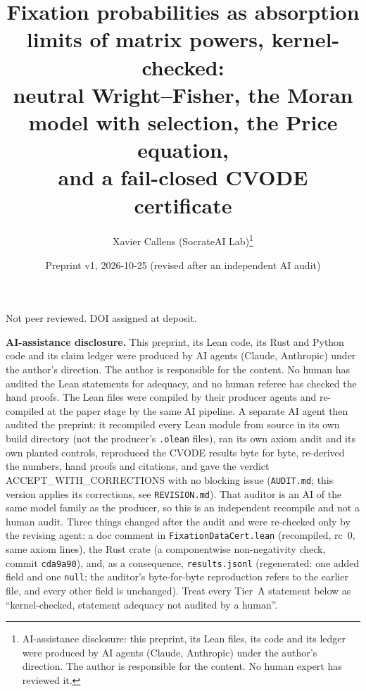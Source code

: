 \documentclass[11pt]{article}
\title{Fixation probabilities as absorption limits of matrix powers, kernel-checked:\\
neutral Wright--Fisher, the Moran model with selection, the Price equation,\\
and a fail-closed CVODE certificate}
\author{Xavier Callens (SocrateAI Lab)\thanks{AI-assistance disclosure: this preprint, its Lean files, its code and
its ledger were produced by AI agents (Claude, Anthropic) under the author's direction. The author is responsible for
the content. No human expert has reviewed it.}}
\date{Preprint v1, 2026-10-25 (revised after an independent AI audit)}
\theoremstyle{remark}
\newcommand{\lean}[1]{\texttt{#1}}
\begin{document}
\maketitle
\begin{center}\small Not peer reviewed. DOI assigned at deposit.\end{center}

\noindent\textbf{AI-assistance disclosure.} This preprint, its Lean code, its Rust and Python code and its claim ledger
were produced by AI agents (Claude, Anthropic) under the author's direction. The author is responsible for the content.
No human has audited the Lean statements for adequacy, and no human referee has checked the hand proofs. The Lean files
were compiled by their producer agents and re-compiled at the paper stage by the same AI pipeline. A separate AI agent
then audited the preprint: it recompiled every Lean module from source in its own build directory (not the producer's
\texttt{.olean} files), ran its own axiom audit and its own planted controls, reproduced the CVODE results byte for byte,
re-derived the numbers, hand proofs and citations, and gave the verdict ACCEPT\_WITH\_CORRECTIONS with no blocking issue
(\texttt{AUDIT.md}; this version applies its corrections, see \texttt{REVISION.md}). That auditor is an AI of the same model
family as the producer, so this is an independent recompile and not a human audit. Three things changed after the audit
and were re-checked only by the revising agent: a doc comment in \lean{FixationDataCert.lean} (recompiled, rc~0, same axiom
lines), the Rust crate (a componentwise non-negativity check, commit \texttt{cda9a90}), and, as a consequence, \texttt{results.jsonl}
(regenerated: one added field and one \texttt{null}; the auditor's byte-for-byte reproduction refers to the earlier file, and every other field is unchanged). Treat every Tier~A statement
below as ``kernel-checked, statement adequacy not audited by a human''.
\end{document}
